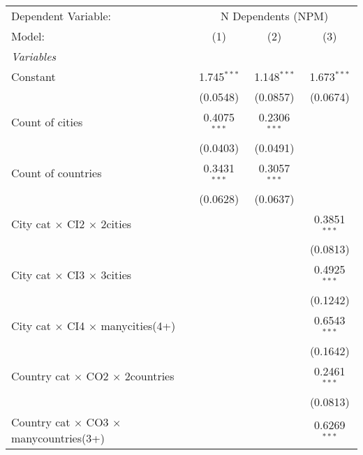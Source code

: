 
\begingroup
\centering
\begin{tabular}{lccc}
   \tabularnewline \midrule \midrule
   Dependent Variable: & \multicolumn{3}{c}{N Dependents (NPM)}\\
   Model:                                                & (1)            & (2)            & (3)\\  
   \midrule
   \emph{Variables}\\
   Constant                                              & 1.745$^{***}$  & 1.148$^{***}$  & 1.673$^{***}$\\   
                                                         & (0.0548)       & (0.0857)       & (0.0674)\\   
   Count of cities                                       & 0.4075$^{***}$ & 0.2306$^{***}$ &   \\   
                                                         & (0.0403)       & (0.0491)       &   \\   
   Count of countries                                    & 0.3431$^{***}$ & 0.3057$^{***}$ &   \\   
                                                         & (0.0628)       & (0.0637)       &   \\   
   City cat $\times$ CI2 $\times$ 2cities                &                &                & 0.3851$^{***}$\\   
                                                         &                &                & (0.0813)\\   
   City cat $\times$ CI3 $\times$ 3cities                &                &                & 0.4925$^{***}$\\   
                                                         &                &                & (0.1242)\\   
   City cat $\times$ CI4 $\times$ manycities(4+)         &                &                & 0.6543$^{***}$\\   
                                                         &                &                & (0.1642)\\   
   Country cat $\times$ CO2 $\times$ 2countries          &                &                & 0.2461$^{***}$\\   
                                                         &                &                & (0.0813)\\   
   Country cat $\times$ CO3 $\times$ manycountries(3+)   &                &                & 0.6269$^{***}$\\   

\end{tabular}
